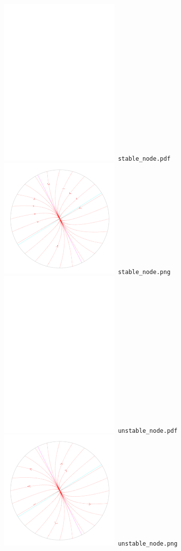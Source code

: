 \documentclass[a4paper]{amsart}
\begin{document}
\includegraphics[width=6cm]{stable_node.pdf}\verb+ stable_node.pdf+\\
\includegraphics[width=6cm]{stable_node.png}\verb+ stable_node.png+\\
\includegraphics[width=6cm]{unstable_node.pdf}\verb+ unstable_node.pdf+\\
\includegraphics[width=6cm]{unstable_node.png}\verb+ unstable_node.png+\\
\end{document}
